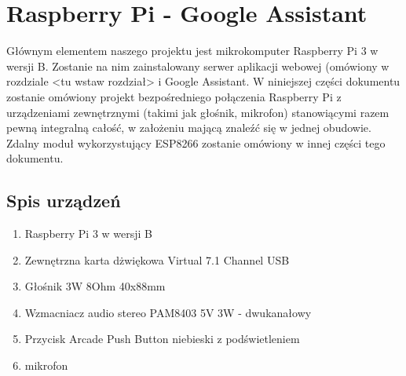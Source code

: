 
\section{Raspberry Pi - Google Assistant}

Głównym elementem naszego projektu jest mikrokomputer Raspberry Pi 3 w wersji B. Zostanie na nim zainstalowany serwer aplikacji webowej (omówiony w rozdziale <tu wstaw rozdział> i Google Assistant. W niniejszej części dokumentu zostanie omówiony projekt bezpośredniego połączenia Raspberry Pi z urządzeniami zewnętrznymi (takimi jak głośnik, mikrofon) stanowiącymi razem pewną integralną całość, w założeniu mającą znaleźć się w jednej obudowie. Zdalny moduł wykorzystujący ESP8266 zostanie omówiony w innej części tego dokumentu.

\subsection{Spis urządzeń}

\begin{enumerate}
\item Raspberry Pi 3 w wersji B \\
	\begin{center}
	\end{center}
\item Zewnętrzna karta dżwiękowa Virtual 7.1 Channel USB \\
	\begin{center}
	\end{center}
\item Głośnik 3W 8Ohm 40x88mm \\
	\begin{center}
	\end{center}
\item Wzmacniacz audio stereo PAM8403 5V 3W - dwukanałowy \\
	\begin{center}
	\end{center}
\item Przycisk Arcade Push Button niebieski z podświetleniem \\
	\begin{center}
	\end{center}
\item mikrofon
\end{enumerate}


